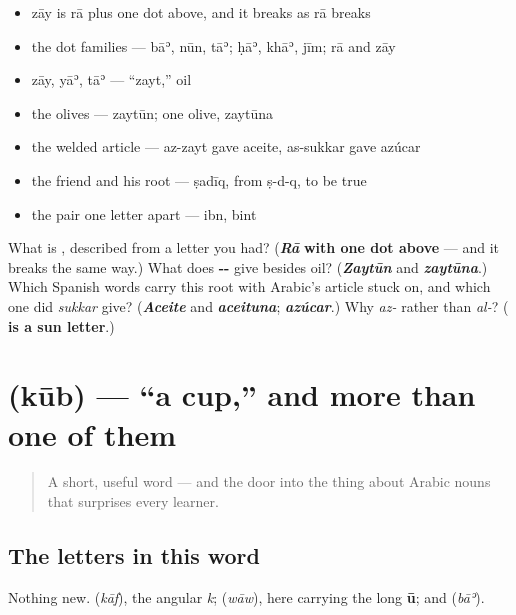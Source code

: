 \begin{itemize}
\raggedright
  \item zāy is rā plus one dot above, and it breaks as rā breaks
  \item the dot families — bāʾ, nūn, tāʾ; ḥāʾ, khāʾ, jīm; rā and zāy
  \item zāy, yāʾ, tāʾ — \textquotedblleft{}zayt,\textquotedblright{} oil
  \item the olives — zaytūn; one olive, zaytūna
  \item the welded article — az-zayt gave aceite, as-sukkar gave azúcar
  \item the friend and his root — ṣadīq, from ṣ-d-q, to be true
  \item the pair one letter apart — ibn, bint
\end{itemize}

\begin{tcolorbox}[breakable,colback=teal!4,colframe=teal!35!black,title={Before you move on}]
What is \textbf{}, described from a letter you had? (\emph{\textbf{Rā}} \textbf{with one dot above} — and it breaks the same way.) What does \textbf{--} give besides oil? (\emph{\textbf{Zaytūn}} and \emph{\textbf{zaytūna}}.) Which Spanish words carry this root with Arabic's article stuck on, and which one did \emph{sukkar} give? (\emph{\textbf{Aceite}} and \emph{\textbf{aceituna}}; \emph{\textbf{azúcar}}.) Why \emph{az-} rather than \emph{al-}? (\textbf{ is a sun letter}.)
\end{tcolorbox}
\section[\texorpdfstring{\ar{كوب} (kūb)}{كوب (kūb)}]{ (kūb) — \textquotedblleft{}a cup,\textquotedblright{} and more than one of them}

\label{lesson:AR-C36-kub}



\begin{quote}
A short, useful word — and the door into the thing about Arabic nouns that surprises every learner.
\end{quote}

\subsection*{The letters in this word}
Nothing new. \textbf{} (\emph{kāf}), the angular \emph{k}; \textbf{} (\emph{wāw}), here carrying the long \textbf{ū}; and \textbf{} (\emph{bāʾ}).

